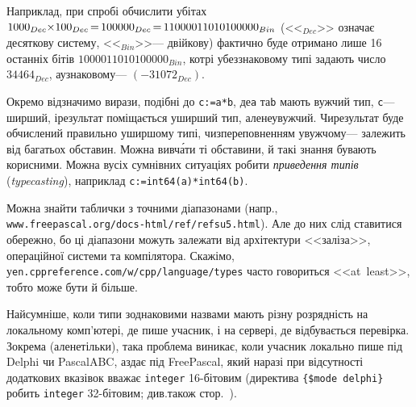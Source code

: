 \label{text:overflow-example}
Наприклад, при спробі обчислити у\nolinebreak[3] бітах $1000_{Dec}{\*}100_{Dec}\dib{{=}}100000_{Dec}\dib{{=}}11000011010100000_{Bin}$ (<<$_{Dec}$>> означає десяткову систему, <<$_{Bin}$>>\nolinebreak[3] --- двійкову) фактично буде отримано лише 16 останніх бітів $1000011010100000_{Bin}$, котрі у\nolinebreak[3] беззнаковому типі задають число $34464_{Dec}$, а\nolinebreak[2] у\nolinebreak[2] знаковому\nolinebreak[3] --- $({-}31072_{Dec})$. 

Окремо відзначимо вирази, подібні до \texttt{c:=a*b}, де\nolinebreak[3] \texttt{a} та\nolinebreak[3] \texttt{b} мають вужчий тип, \texttt{c}\nolinebreak[3] --- ширший, і\nolinebreak[3] результат поміщається у\nolinebreak[2] ширший тип, але\nolinebreak[3] не\nolinebreak[2] у\nolinebreak[3] вужчий. Чи\nolinebreak[3] результат буде обчислений правильно у\nolinebreak[3] ширшому типі, чи\nolinebreak[2] з\nolinebreak[3] переповненням у\nolinebreak[3] вужчому\nolinebreak[3] --- залежить від багатьох обставин. Можна вивч\'{а}ти ті обставини, й такі знання бувають корисними. Можна в\nolinebreak[3] усіх сумнівних ситуаціях робити \emph{приведення типів} (\emph{type\-casting}), наприклад \texttt{c:=int64(a)*int64(b)}.

Можна знайти таблички з точними діапазонами (напр., \verb"www.freepascal."\linebreak[0]\verb"org/"\linebreak[1]\verb"docs-html/"\linebreak[0]\verb"ref/"\linebreak[0]\verb"refsu5.html"). Але до них слід ставитися обережно, бо ці діапазони можуть залежати від архітектури <<заліза>>, операційної системи та компілятора. Скажімо, у\nolinebreak[1] \verb"en.cppreference."\linebreak[0]\verb"com/"\linebreak[1]\verb"w/cpp/"\linebreak[0]\verb"language/"\linebreak[0]\verb"types" часто говориться <<at~least>>, тобто може бути й більше.

Найсумніше, коли типи з\nolinebreak[3] однаковими назвами мають різну розрядність на локальному комп'ютері, де пише учасник, і на сервері, де відбувається перевірка. Зокрема (але\nolinebreak[1] не\nolinebreak[1] тільки), така проблема виникає, коли учасник локально пише під Delphi чи PascalABC, а\nolinebreak[1] здає під Free\nolinebreak[1] Pascal, який наразі при відсут\-ності додаткових вказівок вважає \texttt{integer} 16-\nolinebreak[1]бітовим (директива \verb"{$mode delphi}" робить \texttt{integer} 32-\nolinebreak[1]бітовим; див.\nolinebreak[2] також стор.~\pageref{text:notes-about-delphi-mode}).


